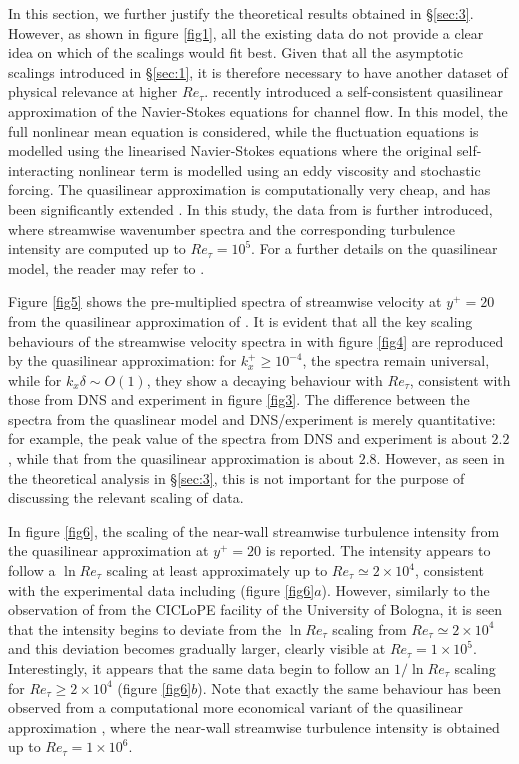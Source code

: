 \documentclass{jfm}
\begin{document}
In this section, we further justify the theoretical results obtained in \S\ref{sec:3}. However, as shown in figure \ref{fig1}, all the existing data do not provide a clear idea on which of the scalings would fit best. Given that all the asymptotic scalings introduced in \S\ref{sec:1}, it is therefore necessary to have another dataset of physical relevance at higher $Re_\tau$. \cite{Hwang2020a} recently introduced a self-consistent quasilinear approximation of the Navier-Stokes equations for channel flow. In this model, the full nonlinear mean equation is considered, while the fluctuation equations is modelled using the linearised Navier-Stokes equations where the original self-interacting nonlinear term is modelled using an eddy viscosity and stochastic forcing. The quasilinear approximation is computationally very cheap, and has been significantly extended \cite[]{Skouloudis2021,Holford2023b}. In this study, the data from \cite[]{Holford2023b} is further introduced, where streamwise wavenumber spectra and the corresponding turbulence intensity are computed up to $Re_\tau=10^5$. For a further details on the quasilinear model, the reader may refer to \cite[]{Holford2023b}.

Figure \ref{fig5} shows the pre-multiplied spectra of streamwise velocity at $y^+=20$ from the quasilinear approximation of \cite[]{Holford2023b}. It is evident that all the key scaling behaviours of the streamwise velocity spectra in with figure \ref{fig4} are reproduced by the quasilinear approximation: for $k_x^+ \geq 10^{-4}$, the spectra remain universal, while for $k_x \delta \sim O(1)$, they show a decaying behaviour with $Re_\tau$, consistent with those from DNS and experiment in figure \ref{fig3}. The difference between the spectra from the quaslinear model and DNS/experiment is merely quantitative: for example, the peak value of the spectra from DNS and experiment is about $2.2$, while that from the quasilinear approximation is about $2.8$. However, as seen in the theoretical analysis in \S\ref{sec:3}, this is not important for the purpose of discussing the relevant scaling of data.

In figure \ref{fig6}, the scaling of the near-wall streamwise turbulence intensity from the quasilinear approximation at $y^+=20$ is reported. The intensity appears to follow a $\ln Re_\tau$ scaling at least approximately up to $Re_\tau \simeq 2 \times 10^4$, consistent with the experimental data including \cite{Samie2018} (figure \ref{fig6}$a$). However, similarly to the observation of \cite{Willert2017} from the CICLoPE facility of the University of Bologna, it is seen that the intensity begins to deviate from the $\ln Re_\tau$ scaling from $Re_\tau \simeq 2 \times 10^4$ and this deviation becomes gradually larger, clearly visible at $Re_\tau = 1 \times 10^5$. Interestingly, it appears that the same data begin to follow an $1/\ln Re_\tau$ scaling for $Re_\tau \geq 2 \times 10^4$ (figure \ref{fig6}$b$). Note that exactly the same behaviour has been observed from a computational more economical variant of the quasilinear approximation \cite{Skouloudis2021}, where the near-wall streamwise turbulence intensity is obtained up to $Re_\tau = 1 \times 10^6$.
\end{document}
